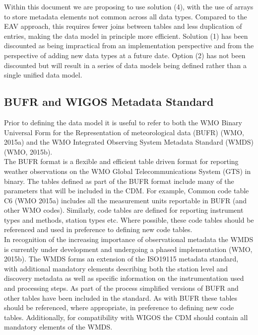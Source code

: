 \documentclass[a4paper]{article}
\begin{document}
Within this document we are proposing to use solution (4), with the use of arrays to store metadata elements not common across all data types. Compared to the EAV approach, this requires fewer joins between tables and less duplication of entries, making the data model in principle more efficient. Solution (1) has been discounted as being impractical from an implementation perspective and from the perspective of adding new data types at a future date. Option (2) has not been discounted but will result in a series of data models being defined rather than a single unified data model.\\



\subsection {BUFR and WIGOS Metadata Standard}
Prior to defining the data model it is useful to refer to both the WMO Binary Universal Form for the Representation of meteorological data (BUFR) (WMO, 2015a) and the WMO Integrated Observing System Metadata Standard (WMDS) (WMO, 2015b). \\

The BUFR format is a flexible and efficient table driven format for reporting weather observations on the WMO Global Telecommunications System (GTS) in binary. The tables defined as part of the BUFR format include many of the parameters that will be included in the CDM. For example, Common code table C6 (WMO 2015a) includes all the measurement units reportable in BUFR (and other WMO codes). Similarly, code tables are defined for reporting instrument types and methods, station types etc. Where possible, these code tables should be referenced and used in preference to defining new code tables.\\

In recognition of the increasing importance of observational metadata the WMDS is currently under development and undergoing a phased implementation (WMO, 2015b). The WMDS forms an extension of the ISO19115 metadata standard, with additional mandatory elements describing both the station level and discovery metadata as well as specific information on the instrumentation used and processing steps. As part of the process simplified versions of BUFR and other tables have been included in the standard. As with BUFR these tables should be referenced, where appropriate, in preference to defining new code tables. Additionally, for compatibility with WIGOS the CDM should contain all mandatory elements of the WMDS. 
\end{document}
